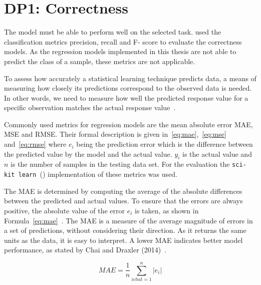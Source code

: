 \section{DP1: Correctness}\label{sec:dp1:-correctness}

The model must be able to perform well on the selected task.
\cite{siebert2022construction} used the classification metrics precision, recall and F-
score to evaluate the correctness models.
As the regression models implemented in this thesis are not able to predict
the class of a sample, these metrics are not applicable.

To assess how accurately a statistical learning technique predicts data, a means of measuring how closely
its predictions correspond to the observed data is needed.
In other words, we need to measure how well the predicted response value for a specific observation matches the
actual response value~\cite[p. 29]{hastie2009elements}.

Commonly used metrics for regression models are the mean absolute error \ac{MAE},
\ac{MSE} and \ac{RMSE}.
Their formal description is given in~\ref{eq:mae},~\ref{eq:mse} and~\ref{eq:rmse} where
$e_i$ being the prediction error which is the difference between the predicted value
by the model and the actual value.
$y_i$ is the actual value and $n$ is the number of samples in the testing data set.
For the evaluation the \texttt{sci-kit learn}~(\cite{scikit-learn}) implementation of
these metrics was used.

The MAE is determined by computing the average of the absolute differences between the predicted and actual values.
To ensure that the errors are always positive, the absolute value of the error $e_i$ is taken, as shown in
Formula~\ref{eq:mae}~\cite[p. 1248]{chai2014root}.
The MAE is a measure of the average magnitude of errors in a set of predictions, without considering their direction.
As it returns the same units as the data, it is easy to interpret.
A lower MAE indicates better model performance, as stated by Chai and Draxler (2014)~\cite[pp. 1248]{chai2014root}.

\begin{tcolorbox}[arc=0pt,boxrule=0.5pt]
    \begin{equation}
        MAE = \frac{1}{n} \sum_{ichat=1}^{n} |e_i|
        \label{eq:mae}
    \end{equation}
\end{tcolorbox}

